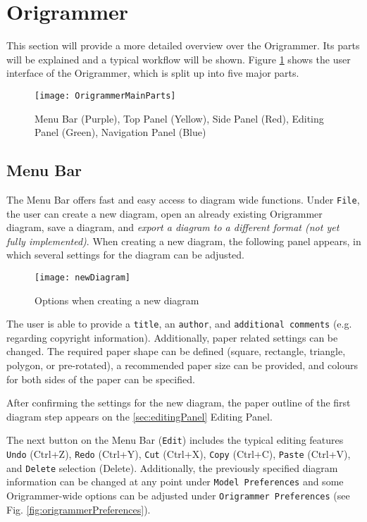 
\section{Origrammer}
\label{sec:origrammer}

This section will provide a more detailed overview over the Origrammer. Its parts will be explained and a typical workflow will be shown. Figure \ref{fig:origrammerMain} shows the user interface of the Origrammer, which is split up into five major parts.

\begin{figure}[htbp]
	\centering
	\texttt{[image: OrigrammerMainParts]}
	\caption{Menu Bar (Purple), Top Panel (Yellow), Side Panel (Red), Editing Panel (Green), Navigation Panel (Blue)}
	\label{fig:origrammerMain}
\end{figure}

\subsection{Menu Bar}

The Menu Bar offers fast and easy access to diagram wide functions. Under \texttt{File}, the user can create a new diagram, open an already existing Origrammer diagram, save a diagram, and \emph{export a diagram to a different format (not yet fully implemented)}. When creating a new diagram, the following panel appears, in which several settings for the diagram can be adjusted.

\begin{figure}[htbp]
	\centering
	\texttt{[image: newDiagram]}
	\caption{Options when creating a new diagram}
	\label{fig:newDiagram}
\end{figure}

\newpage
The user is able to provide a \texttt{title}, an \texttt{author}, and \texttt{additional comments} (e.g. regarding copyright information). Additionally, paper related settings can be changed. The required paper shape can be defined (square, rectangle, triangle, polygon, or pre-rotated), a recommended paper size can be provided, and colours for both sides of the paper can be specified.

After confirming the settings for the new diagram, the paper outline of the first diagram step appears on the \ref{sec:editingPanel} Editing Panel.

The next button on the Menu Bar (\texttt{Edit}) includes the typical editing features \texttt{Undo} (Ctrl+Z), \texttt{Redo} (Ctrl+Y), \texttt{Cut} (Ctrl+X), \texttt{Copy} (Ctrl+C), \texttt{Paste} (Ctrl+V), and \texttt{Delete} selection (Delete). Additionally, the previously specified diagram information can be changed at any point under \texttt{Model Preferences} and some Origrammer-wide options can be adjusted under \texttt{Origrammer Preferences} (see Fig. \ref{fig:origrammerPreferences}).

